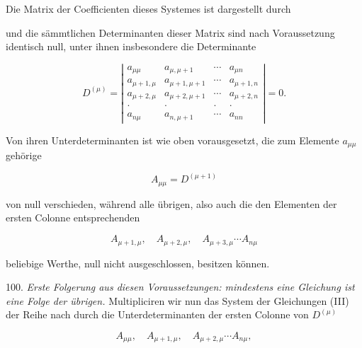 Die Matrix der Coefficienten dieses Systemes ist dargestellt durch


und die sämmtlichen Determinanten dieser Matrix sind nach Voraussetzung
identisch null, unter ihnen insbesondere die Determinante

\[
D^{(\mu)}=
\left|
\begin{array}{cccc}
a_{\mu\mu} & a_{\mu,\mu+1} & \cdots & a_{\mu n}\\
a_{\mu+1,\mu} & a_{\mu+1,\mu+1} & \cdots & a_{\mu+1,n}\\
a_{\mu+2,\mu} & a_{\mu+2,\mu+1} & \cdots & a_{\mu+2,n}\\
\cdot & \cdot & \cdot & \cdot\\
a_{n\mu} & a_{n,\mu+1} & \cdots & a_{nn}
\end{array}
\right|=0.
\]

Von ihren Unterdeterminanten ist wie oben vorausgesetzt, die zum
Elemente $a_{\mu\mu}$ gehörige

\[
A_{\mu\mu}=D^{(\mu+1)}
\]

von null verschieden, während alle übrigen, also auch die den Elementen
der ersten Colonne entsprechenden

\[
A_{\mu+1,\mu},\quad A_{\mu+2,\mu},\quad A_{\mu+3,\mu}\cdots A_{n\mu}
\]

beliebige Werthe, null nicht ausgeschlossen, besitzen können.

100. \textit{Erste Folgerung aus diesen Voraussetzungen: mindestens
eine Gleichung ist eine Folge der übrigen.} Multipliciren wir nun das
System der Gleichungen (III) der Reihe nach durch die
Unterdeterminanten der ersten Colonne von $D^{(\mu)}$

\[
A_{\mu\mu},\quad A_{\mu+1,\mu},\quad A_{\mu+2,\mu}\cdots A_{n\mu},
\]

